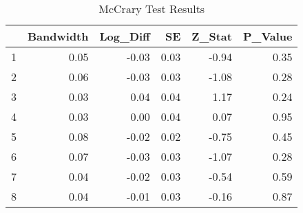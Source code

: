 \begin{table}[ht]
  \centering
  \caption{McCrary Test Results} 
  \label{tab:mccrary_results}
  \begin{tabular}{rrrrrr}
    \hline
   & Bandwidth & Log\_Diff & SE & Z\_Stat & P\_Value \\ 
    \hline
  1 & 0.05 & -0.03 & 0.03 & -0.94 & 0.35 \\ 
    2 & 0.06 & -0.03 & 0.03 & -1.08 & 0.28 \\ 
    3 & 0.03 & 0.04 & 0.04 & 1.17 & 0.24 \\ 
    4 & 0.03 & 0.00 & 0.04 & 0.07 & 0.95 \\ 
    5 & 0.08 & -0.02 & 0.02 & -0.75 & 0.45 \\ 
    6 & 0.07 & -0.03 & 0.03 & -1.07 & 0.28 \\ 
    7 & 0.04 & -0.02 & 0.03 & -0.54 & 0.59 \\ 
    8 & 0.04 & -0.01 & 0.03 & -0.16 & 0.87 \\ 
     \hline
  \end{tabular}

  \end{table}